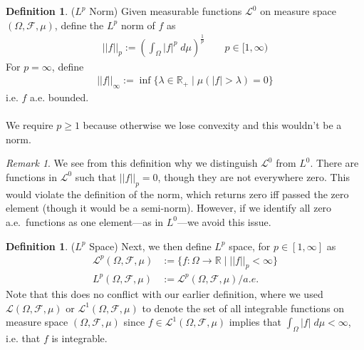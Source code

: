 \documentclass[12pt]{article}
\theoremstyle{plain}
\theoremstyle{definition}
\newtheorem{defn}[thm]{Definition}
\theoremstyle{remark}
\newtheorem*{rmk}{Remark}
\newcommand{\ra}{\rightarrow}
\newcommand{\sF}{\mathscr{F}}
\newcommand{\sL}{\mathscr{L}}
\newcommand{\R}{\mathbb{R}}
\begin{document}
\begin{defn}($L^p$ Norm)
Given measurable functions $\sL^0$ on measure space
$(\Omega,\sF,\mu)$, define the $L^p$ norm of $f$ as
\begin{align*}
  ||f||_p := \left(\int_\Omega |f|^p\;d\mu\right)^{\frac{1}{p}}
  \qquad p \in [1,\infty)
\end{align*}
For $p=\infty$, define
\begin{align*}
  ||f||_\infty := \inf\{\lambda \in\R_+ \;|\; \mu(|f|>\lambda)=0\}
\end{align*}
i.e. $f$ a.e. bounded.
\\
\\
We require $p\geq 1$ because otherwise we lose convexity and this
wouldn't be a norm.
\end{defn}
\begin{rmk}
We see from this definition why we distinguish $\sL^0$ from $L^0$.
There are functions in $\sL^0$ such that $||f||_p = 0$, though they
are not everywhere zero. This would violate the definition of the norm,
which returns zero iff passed the zero element (though it would be a
semi-norm). However, if we identify all zero a.e.\ functions as one
element---as in $L^0$---we avoid this issue.
\end{rmk}

\begin{defn}($L^p$ Space)
Next, we then define $L^p$ space, for $p\in[1,\infty]$ as
\begin{align*}
    \sL^p(\Omega,\sF,\mu)
    &:=\{f: \Omega \ra \R \;|\; || f||_p < \infty\} \\
    L^p(\Omega,\sF,\mu)
    &:= \sL^p(\Omega,\sF,\mu)/a.e.
\end{align*}
Note that this does no conflict with our earlier definition, where we
used $\sL(\Omega,\sF,\mu)$ or $\sL^1(\Omega,\sF,\mu)$ to denote the set
of all integrable functions on measure space $(\Omega,\sF,\mu)$ since
$f\in \sL^1(\Omega,\sF,\mu)$ implies that
$\int_\Omega |f| \; d\mu <\infty$, i.e. that $f$ is integrable.
\end{defn}
\end{document}
